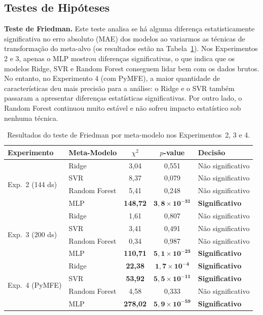 \documentclass[12pt]{article}
\begin{document}
\subsection{Testes de Hipóteses}

\textbf{Teste de Friedman.} Este teste analisa se há alguma diferença estatisticamente significativa no erro absoluto (MAE) dos modelos ao variarmos as técnicas de transformação do meta-alvo (os resultados estão na Tabela~\ref{tab:friedman_all}). Nos Experimentos 2 e 3, apenas o MLP mostrou diferenças significativas, o que indica que os modelos Ridge, SVR e Random Forest conseguem lidar bem com os dados brutos. No entanto, no Experimento 4 (com PyMFE), a maior quantidade de características deu mais precisão para a análise: o Ridge e o SVR também passaram a apresentar diferenças estatísticas significativas. Por outro lado, o Random Forest continuou muito estável e não sofreu impacto estatístico sob nenhuma técnica.

\begin{table}[H]
\centering
\caption{Resultados do teste de Friedman por meta-modelo nos Experimentos~2, 3 e 4.}
\label{tab:friedman_all}
\small
\begin{tabular}{llccl}
\toprule
\textbf{Experimento} & \textbf{Meta-Modelo} & \textbf{$\chi^2$} & \textbf{$p$-value} & \textbf{Decisão} \\
\midrule
\multirow{4}{*}{Exp.~2 (144 ds)}
 & Ridge        & 3,04            & 0,551                                    & Não significativo \\
 & SVR          & 8,37            & 0,079                                    & Não significativo \\
 & Random Forest & 5,41           & 0,248                                    & Não significativo \\
 & MLP          & \textbf{148,72} & $\mathbf{3{,}8 \times 10^{-31}}$        & \textbf{Significativo} \\
\midrule
\multirow{4}{*}{Exp.~3 (200 ds)}
 & Ridge        & 1,61            & 0,807                                    & Não significativo \\
 & SVR          & 3,41            & 0,491                                    & Não significativo \\
 & Random Forest & 0,34           & 0,987                                    & Não significativo \\
 & MLP          & \textbf{110,71} & $\mathbf{5{,}1 \times 10^{-23}}$        & \textbf{Significativo} \\
\midrule
\multirow{4}{*}{Exp.~4 (PyMFE)}
 & Ridge        & \textbf{22,38}  & $\mathbf{1{,}7 \times 10^{-4}}$         & \textbf{Significativo} \\
 & SVR          & \textbf{53,92}  & $\mathbf{5{,}5 \times 10^{-11}}$        & \textbf{Significativo} \\
 & Random Forest & 4,58           & 0,333                                    & Não significativo \\
 & MLP          & \textbf{278,02} & $\mathbf{5{,}9 \times 10^{-59}}$        & \textbf{Significativo} \\
\bottomrule
\end{tabular}
\end{table}
\end{document}
